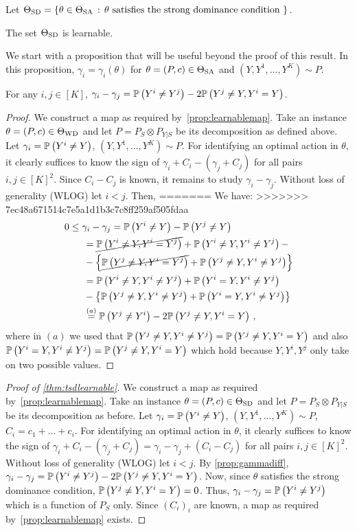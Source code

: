 Let $\Theta_{\mathrm{SD}} = \{ \theta\in \Theta_{\mathrm{SA}}\,:\, \theta \text{ satisfies the strong dominance condition } \}$.
\begin{thm}
\label{thm:tsdlearnable}
The set $\Theta_{\mathrm{SD}}$ is learnable.
\end{thm}
We start with a proposition that will be useful beyond the proof of this result.
In this proposition, $\gamma_i = \gamma_i(\theta)$ for $\theta=(P,c)\in \Theta_{\mathrm{SA}}$ and $(Y,Y^1,\dots,Y^K) \sim P$.
\begin{prop}\label{prop:gammadiff}
For any $i,j\in [K]$, $\gamma_i - \gamma_j = \mathbb{P}\left(Y^i\ne Y^j\right) - 2\mathbb{P}\left( Y^j \ne Y, Y^i=Y\right)$.
\end{prop}
\begin{proof}

We construct a map as required by~\cref{prop:learnablemap}.
Take an instance $\theta = (P,c)\in \Theta_{\mathrm{WD}}$ and let $P = P_S \otimes P_{Y|S}$ be its decomposition
as defined above.
Let $\gamma_i = \mathbb{P}\left(Y^i \ne Y\right)$, $(Y,Y^1,\dots,Y^K)\sim P$.
For identifying an optimal action in $\theta$, it clearly suffices
to know the sign of $\gamma_i + C_i - (\gamma_j +C_j)$ for all pairs $i,j\in [K]^2$.
Since $C_i - C_j$ is known, it remains to study $\gamma_i-\gamma_j$.
Without loss of generality (WLOG) let $i<j$.
Then, 
=======
We have:
>>>>>>> 7ec48a671514c7e5a1d1b3c7c8ff259af505fdaa
\begin{align*}
\MoveEqLeft 0  \le \gamma_i  - \gamma_j = \Prob{Y^i\ne Y} - \Prob{Y^j\ne Y} \\
& = \cancel{\Prob{Y^i\ne Y, Y^i=Y^j}} + \Prob{ Y^i\ne Y, Y^i\ne Y^j } - \\
& - \left\{ 
       \cancel{\Prob{Y^j\ne Y, Y^i=Y^j}} + \Prob{ Y^j\ne Y, Y^i\ne Y^j }\right\}\\
& = \Prob{ Y^i\ne Y, Y^i \ne Y^j } + \Prob{Y^i=Y,Y^i\ne Y^j}       \\
& - \left\{ 
	  \Prob{ Y^j \ne Y, Y^i\ne Y^j } + \Prob{ Y^i=Y,Y^i\ne Y^j}
	 \right\}\\
& \stackrel{\footnotesize (a)}{=} \Prob{ Y^j \ne Y^i } -2 \Prob{ Y^j\ne Y, Y^i = Y }\,,
\end{align*}
where in $(a)$ we used that $\mathbb{P}\left( Y^j \ne Y, Y^i\ne Y^j \right) =  \mathbb{P}\left( Y^j\ne Y,Y^i= Y\right)$ and also
$\mathbb{P}\left( Y^i=Y,Y^i\ne Y^j\right) = \mathbb{P}\left( Y^j\ne Y,Y^i= Y\right)$
which hold because $Y,Y^i,Y^j$ only take on two possible values.
\end{proof}
\begin{proof}[Proof of \cref{thm:tsdlearnable}]
We construct a map as required by~\cref{prop:learnablemap}.
Take an instance $\theta = (P,c)\in \Theta_{\mathrm{SD}}$ and let $P = P_S \otimes P_{Y|S}$ be its decomposition as before.
Let $\gamma_i = \mathbb{P}\left(Y^i \ne Y\right)$, $(Y,Y^1,\dots,Y^K)\sim P$, $C_i = c_1+\dots+c_i$.
For identifying an optimal action in $\theta$, it clearly suffices
to know the sign of $\gamma_i + C_i - (\gamma_j +C_j) = \gamma_i-\gamma_j + (C_i-C_j)$ for all pairs $i,j\in [K]^2$.
Without loss of generality (WLOG) let $i<j$. By \cref{prop:gammadiff},
$\gamma_i - \gamma_j = \mathbb{P}\left( Y^i \ne Y^j \right) -2 \mathbb{P}\left( Y^j\ne Y, Y^i = Y \right)$.
Now, since $\theta$ satisfies the strong dominance condition, $ \mathbb{P}\left( Y^j\ne Y, Y^i = Y \right) = 0$.
Thus, $\gamma_i - \gamma_j = \mathbb{P}\left( Y^i \ne Y^j \right)$
which is a function of $P_S$ only.
Since $(C_i)_i$ are known, a map as required by~\cref{prop:learnablemap} exists.
\end{proof}
